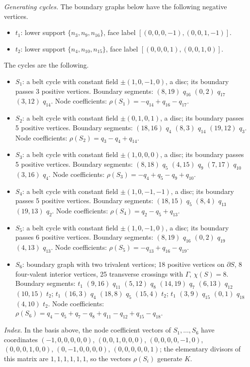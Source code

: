 \emph{Generating cycles.}
The boundary graphs below have the following negative vertices.
\begin{itemize}
\item $t_{1}$: lower support $\{n_{3},n_{9},n_{16}\}$, face label $[(0,0,0,-1),(0,0,1,-1)]$.
\item $t_{2}$: lower support $\{n_{4},n_{10},n_{15}\}$, face label $[(0,0,0,1),(0,0,1,0)]$.
\end{itemize}
The cycles are the following.
\begin{itemize}
\item $S_{1}$: a belt cycle with constant field $\pm(1,0,-1,0)$, a disc; its boundary passes 3 positive vertices.
Boundary segments: $(8,19)$ $q_{16}$ $(0,2)$ $q_{17}$ $(3,12)$ $q_{14}$.
Node coefficients: $\rho(S_{1})=-q_{14}+q_{16}-q_{17}$.
\item $S_{2}$: a belt cycle with constant field $\pm(0,1,0,1)$, a disc; its boundary passes 5 positive vertices.
Boundary segments: $(18,16)$ $q_{4}$ $(8,3)$ $q_{14}$ $(19,12)$ $q_{3}$.
Node coefficients: $\rho(S_{2})=q_{3}-q_{4}+q_{14}$.
\item $S_{3}$: a belt cycle with constant field $\pm(1,0,0,0)$, a disc; its boundary passes 5 positive vertices.
Boundary segments: $(8,18)$ $q_{5}$ $(4,15)$ $q_{9}$ $(7,17)$ $q_{10}$ $(3,16)$ $q_{4}$.
Node coefficients: $\rho(S_{3})=-q_{4}+q_{5}-q_{9}+q_{10}$.
\item $S_{4}$: a belt cycle with constant field $\pm(1,0,-1,-1)$, a disc; its boundary passes 5 positive vertices.
Boundary segments: $(18,15)$ $q_{5}$ $(8,4)$ $q_{13}$ $(19,13)$ $q_{2}$.
Node coefficients: $\rho(S_{4})=q_{2}-q_{5}+q_{13}$.
\item $S_{5}$: a belt cycle with constant field $\pm(1,0,-1,0)$, a disc; its boundary passes 6 positive vertices.
Boundary segments: $(8,19)$ $q_{16}$ $(0,2)$ $q_{19}$ $(4,13)$ $q_{13}$.
Node coefficients: $\rho(S_{5})=-q_{13}+q_{16}-q_{19}$.
\item $S_{6}$: boundary graph with two trivalent vertices; 18 positive vertices on $\partial S$, 8 four-valent interior vertices, 25 transverse crossings with $\Gamma$, $\chi(S)=8$.
Boundary segments: $t_{1}$ $(9,16)$ $q_{11}$ $(5,12)$ $q_{8}$ $(14,19)$ $q_{7}$ $(6,13)$ $q_{12}$ $(10,15)$ $t_{2}$; $t_{1}$ $(16,3)$ $q_{4}$ $(18,8)$ $q_{5}$ $(15,4)$ $t_{2}$; $t_{1}$ $(3,9)$ $q_{15}$ $(0,1)$ $q_{18}$ $(4,10)$ $t_{2}$.
Node coefficients: $\rho(S_{6})=q_{4}-q_{5}+q_{7}-q_{8}+q_{11}-q_{12}+q_{15}-q_{18}$.
\end{itemize}
\emph{Index.} In the basis above, the node coefficient vectors of $S_1,\dots,S_{6}$ have coordinates $(-1,0,0,0,0,0)$, $(0,0,1,0,0,0)$, $(0,0,0,0,-1,0)$, $(0,0,0,1,0,0)$, $(0,-1,0,0,0,0)$, $(0,0,0,0,0,1)$; the elementary divisors of this matrix are $1,1,1,1,1,1$, so the vectors $\rho(S_i)$ generate $K$.


